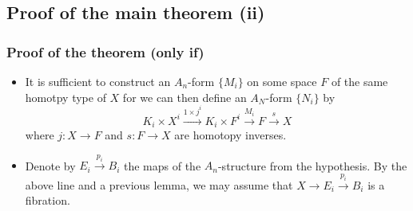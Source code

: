 \documentclass{beamer}
\theoremstyle{definition}
\begin{document}
\subsection{Proof of the main theorem (ii)}
\begin{frame}
\frametitle{Proof of the theorem (only if)}
\begin{itemize}
\item<1-> It is sufficient to construct an $A_n$-form $\{M_i\}$ on some space $F$ of the same homotpy type of $X$ for we can then define an $A_N$-form $\{N_i\}$ by 
\[K_i\times X^i\xrightarrow{1\times j^i}K_i\times F^i\xrightarrow{M_i}F\xrightarrow{s}X\]
where $j:X\to F$ and $s:F\to X$ are homotopy inverses.
\item<2-> Denote by $E_i\xrightarrow{p_i} B_i$ the maps of the $A_n$-structure from the hypothesis. By the above line and a previous lemma, we may assume that $X\to E_i\xrightarrow{p_i} B_i$ is a fibration.
\end{itemize}

\end{frame}
\end{document}
